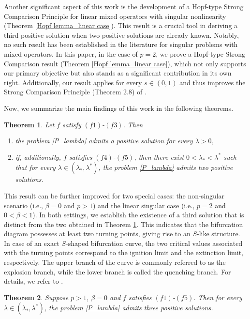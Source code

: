 \documentclass[reqno,oneside]{amsart}
\newtheorem{theorem}{Theorem}[section]
\theoremstyle{definition}
\theoremstyle{remark}
\numberwithin{equation}{section}
\newcommand{\la} {\lambda}
\newcommand{\ba}{\beta}
\begin{document}
Another significant aspect of this work is the development of a Hopf-type Strong Comparison Principle for linear mixed operators with singular nonlinearity (Theorem \ref{Hopf lemma_linear case}). This result is a crucial tool in deriving a third positive solution when two positive solutions are already known. Notably, no such result has been established in the literature for singular problems with mixed operators. In this paper, in the case of $p=2$, we prove a Hopf-type Strong Comparison result (Theorem \ref{Hopf lemma_linear case}), which not only supports our primary objective but also stands as a significant contribution in its own right. Additionally, our result applies for every $s\in (0,1)$ and thus improves the Strong Comparison Principle (Theorem 2.8) of \cite{dhanya2024interiorboundaryregularitymixed}.

Now, we summarize the main findings of this work in the following theorems.

\begin{theorem}\label{theorem_1}
    Let $f$ satisfy $(f1)$-$(f3)$. Then
    \begin{enumerate}
        \item[(a)] the problem \eqref{P_lambda} admits a positive solution for every $\la>0$,

        \item[(b)] if, additionally, $f$ satisfies $(f4)$-$(f5)$, then there exist $0<\la_* < \la^*$ such that for every $\la\in (\la_* , \la^*)$, the problem \eqref{P_lambda} admits two positive solutions.
    \end{enumerate}
\end{theorem}

This result can be further improved for two special cases: the non-singular scenario (i.e., $\ba=0$ and $p>1$) and the linear singular case (i.e., $p=2$ and $0<\ba <1$). In both settings, we establish the existence of a third solution that is distinct from the two obtained in Theorem \ref{theorem_1}. This indicates that the bifurcation diagram possesses at least two turning points, giving rise to an $S$-like structure. In case of an exact $S$-shaped bifurcation curve, the two critical values associated with the turning points correspond to the ignition limit and the extinction limit, respectively. The upper branch of the curve is commonly referred to as the explosion branch, while the lower branch is called the quenching branch. For details, we refer to \cite{kapila1979}.

\begin{theorem}\label{theorem_2}
    Suppose $p>1$, $\ba=0$ and $f$ satisfies $(f1)$-$(f5)$. Then for every $\la\in (\la_* , \la^*)$, the problem \eqref{P_lambda} admits three positive solutions.
\end{theorem}
\end{document}
